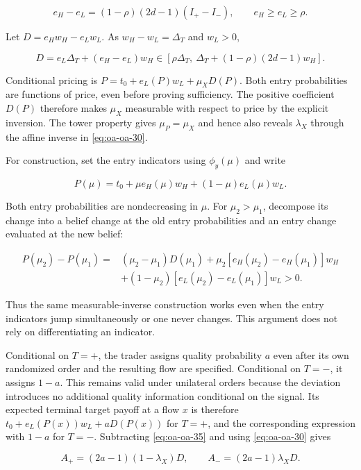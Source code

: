 \documentclass[
  11pt,
]{article}
\begin{document}
\[
e_H-e_L=(1-\rho)(2d-1)(I_+-I_-),\qquad
e_H\ge e_L\ge\rho.
\tag{OA.33}\label{eq:oa-oa-33}
\]

Let \(D=e_Hw_H-e_Lw_L\). As \(w_H-w_L=\Delta_T\) and \(w_L>0\),

\[
D=e_L\Delta_T+(e_H-e_L)w_H
\in[\rho\Delta_T,\ \Delta_T+(1-\rho)(2d-1)w_H].
\tag{OA.34}\label{eq:oa-oa-34}
\]

Conditional pricing is \(P=t_0+e_L(P)w_L+\mu_XD(P)\). Both entry
probabilities are functions of price, even before proving sufficiency.
The positive coefficient \(D(P)\) therefore makes \(\mu_X\) measurable
with respect to price by the explicit inversion. The tower property
gives \(\mu_P=\mu_X\) and hence also reveals \(\lambda_X\) through the
affine inverse in \eqref{eq:oa-oa-30}.

For construction, set the entry indicators using \(\phi_y(\mu)\) and
write

\[
P(\mu)=t_0+\mu e_H(\mu)w_H+(1-\mu)e_L(\mu)w_L.
\tag{OA.35}\label{eq:oa-oa-35}
\]

Both entry probabilities are nondecreasing in \(\mu\). For
\(\mu_2>\mu_1\), decompose its change into a belief change at the old
entry probabilities and an entry change evaluated at the new belief:

\[
\begin{aligned}
P(\mu_2)-P(\mu_1)
={}&(\mu_2-\mu_1)D(\mu_1)
+\mu_2[e_H(\mu_2)-e_H(\mu_1)]w_H\\
&+(1-\mu_2)[e_L(\mu_2)-e_L(\mu_1)]w_L>0.
\end{aligned}
\tag{OA.36}\label{eq:oa-oa-36}
\]

Thus the same measurable-inverse construction works even when the entry
indicators jump simultaneously or one never changes. This argument does
not rely on differentiating an indicator.

Conditional on \(T=+\), the trader assigns quality probability \(a\)
even after its own randomized order and the resulting flow are
specified. Conditional on \(T=-\), it assigns \(1-a\). This remains
valid under unilateral orders because the deviation introduces no
additional quality information conditional on the signal. Its expected
terminal target payoff at a flow \(x\) is therefore
\(t_0+e_L(P(x))w_L+aD(P(x))\) for \(T=+\), and the corresponding
expression with \(1-a\) for \(T=-\). Subtracting \eqref{eq:oa-oa-35} and
using \eqref{eq:oa-oa-30} gives

\[
A_+=(2a-1)(1-\lambda_X)D,\qquad
A_-=(2a-1)\lambda_XD.
\tag{OA.37}\label{eq:oa-oa-37}
\]
\end{document}
